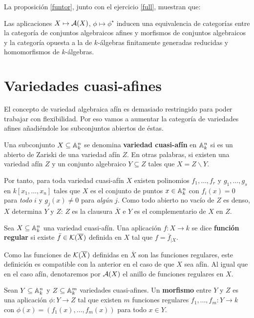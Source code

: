 \documentclass[ACGA.tex]{subfiles}
\begin{document}
La proposición \ref{funtor}, junto con el ejercicio \ref{full}, muestran que:

\begin{coro}\label{equivafin}
 Las aplicaciones $X\mapsto \mathcal{A}(X)$, $\phi\mapsto \phi^\star$ inducen una equivalencia de categorías entre la categoría de conjuntos algebraicos afines y morfismos de conjuntos algebraicos y la categoría opuesta a la de $k$-álgebras finitamente generadas reducidas y homomorfismos de $k$-álgebras.
\end{coro}


\section{Variedades cuasi-afines}

El concepto de variedad algebraica afín es demasiado restringido para poder trabajar con flexibilidad. Por eso vamos a aumentar la categoría de variedades afines añadiéndole los subconjuntos abiertos de éstas.

\begin{defi}
 Una subconjunto $X\subseteq\mathbb{A}^n_k$ se denomina {\bf variedad cuasi-afín} en $\mathbb{A}^n_k$ si es un abierto de Zariski de una variedad afín $Z$. En otras palabras, si existen una variedad afín $Z$ y un conjunto algebraico $Y\subseteq Z$ tales que $X=Z\backslash Y$. 
\end{defi}

Por tanto, para toda variedad cuasi-afín $X$ existen polinomios $f_1,\ldots,f_r$ y $g_1,\ldots,g_s$ en $k[x_1,\ldots,x_n]$ tales que $X$ es el conjunto de puntos $x\in\mathbb{A}^n_k$ con $f_i(x)=0$ para \emph{todo} $i$ y $g_j(x)\neq 0$ para \emph{algún} $j$.
Como todo abierto no vacío de $Z$ es denso, $X$ determina $Y$ y $Z$: $Z$ es la clausura $\overline X$ e $Y$ es el complementario de $X$ en $Z$.

\begin{defi}
 Sea $X\subseteq\mathbb{A}^n_k$ una variedad cuasi-afín. Una aplicación $f:X\to k$ se dice {\bf función regular} si existe $\bar f\in{\mathcal K}(\overline X)$ definida en $X$ tal que $f=\bar f_{|X}$.
\end{defi}

Como las funciones de ${\mathcal K}(\overline X)$ definidas en $\overline X$ son las funciones regulares, este definición es compatible con la anterior en el caso de que $X$ sea afín. Al igual que en el caso afín, denotaremos por $\mathcal{A}(X)$ el anillo de funciones regulares en $X$.

\begin{defi}
 Sean $Y\subseteq\mathbb{A}^n_k$ y $Z\subseteq\mathbb{A}^m_k$ variedades cuasi-afines. Un {\bf morfismo} entre $Y$ y $Z$ es una aplicación $\phi:Y\to Z$ tal que existen $m$ funciones regulares $f_1,\ldots,f_m:Y\to k$ con $\phi(x)=(f_1(x),\ldots,f_m(x))$ para todo $x\in Y$.
\end{defi}
\end{document}
